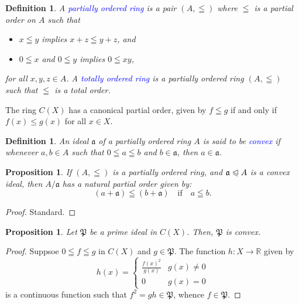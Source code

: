 \documentclass[12pt]{article}
\theoremstyle{thmstyle}
\newtheorem{proposition}[theorem]{Proposition}
\theoremstyle{defstyle}
\newtheorem{definition}[theorem]{Definition}
\newcommand{\R}{\mathbb{R}}
\newcommand{\fraka}{\mathfrak{a}} %
\newcommand{\frakP}{\mathfrak{P}} %
\newcommand{\define}[1]{\textcolor{blue}{\textit{#1}}}
\renewcommand{\le}{\leqslant}
\newcommand{\noreq}{\trianglelefteqslant}
\begin{document}
\begin{definition}
    A \define{partially ordered ring} is a pair $(A,\leqq)$ where $\leqq$ is a partial order on $A$ such that
    \begin{itemize}
        \item $x\leqq y$ implies $x + z \leqq y + z$, and 
        \item $0\leqq x$ and $0\leqq y$ implies $0\leqq xy$,
    \end{itemize}
    for all $x,y,z\in A$.
    A \define{totally ordered ring} is a partially ordered ring $(A,\leqq)$ such that $\leqq$ is a total order.
\end{definition}

The ring $C(X)$ has a canonical partial order, given by $f\leqq g$ if and only if $f(x)\le g(x)$ for all $x\in X$.

\begin{definition}
    An ideal $\fraka$ of a partially ordered ring $A$ is said to be \define{convex} if whenever $a,b\in A$ such that $0\leqq a\leqq b$ and $b\in\fraka$, then $a\in\fraka$.
\end{definition}

\begin{proposition}
    If $(A,\leqq)$ is a partially ordered ring, and $\fraka\noreq A$ is a convex ideal, then $A/\fraka$ has a natural partial order given by: 
    \begin{equation*}
        (a + \fraka)\leqq(b + \fraka) \quad\text{if}\quad a\leqq b.
    \end{equation*}
\end{proposition}
\begin{proof}
    Standard.
\end{proof}

\begin{proposition}
    Let $\frakP$ be a prime ideal in $C(X)$. Then, $\frakP$ is convex.
\end{proposition}
\begin{proof}
    Suppsoe $0\leqq f\leqq g$ in $C(X)$ and $g\in\frakP$. The function $h: X\to\R$ given by 
    \begin{equation*}
        h(x) = 
        \begin{cases}
            \frac{f(x)^2}{g(x)} & g(x)\ne 0\\
            0 & g(x) = 0
        \end{cases}
    \end{equation*}
    is a continuous function such that $f^2 = gh\in\frakP$, whence $f\in\frakP$.
\end{proof}
\end{document}
